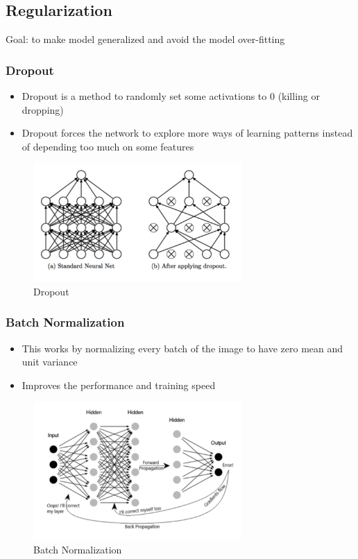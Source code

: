 \documentclass{tron}
\begin{document}
\newpage
\subsection{Regularization}
Goal: to make model generalized and avoid the model over-fitting

\subsubsection{Dropout}
\begin{itemize}
	\item Dropout is a method to randomly set some activations to 0 (killing or dropping)
	\item Dropout forces the network to explore more ways of learning patterns instead of depending too much on some features
\end{itemize}
\begin{figure}[H]
	\center
	\includegraphics[width=300px]{Figs/CNN/dropout}
	\caption{Dropout}
\end{figure}

\subsubsection{Batch Normalization}
\begin{itemize}
	\item This works by normalizing every batch of the image to have zero mean and unit variance
	\item Improves the performance and training speed
\end{itemize}
\begin{figure}[H]
	\center
	\includegraphics[width=300px]{Figs/CNN/batch-norm}
	\caption{Batch Normalization}
\end{figure}
\end{document}
